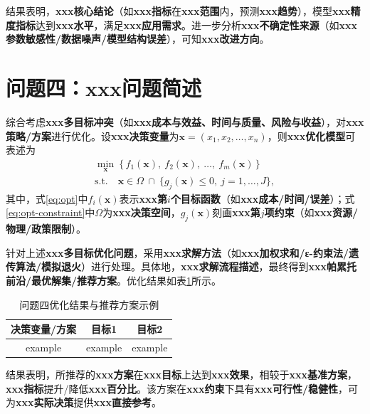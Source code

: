 \documentclass[draft,12pt,a4paper]{ctexart}
\theoremstyle{definition}
\begin{document}
结果表明，\textbf{xxx核心结论}（如\textbf{xxx指标}在\textbf{xxx范围}内，预测\textbf{xxx趋势}），模型\textbf{xxx精度指标}达到\textbf{xxx水平}，满足\textbf{xxx应用需求}。进一步分析\textbf{xxx不确定性来源}（如\textbf{xxx参数敏感性/数据噪声/模型结构误差}），可知\textbf{xxx改进方向}。


\section{问题四：\textbf{xxx问题简述}}

综合考虑\textbf{xxx多目标冲突}（如\textbf{xxx成本与效益、时间与质量、风险与收益}），对\textbf{xxx策略/方案}进行优化。设\textbf{xxx决策变量}为$\boldsymbol{x}=(x_1,x_2,\dots,x_n)$，则\textbf{xxx优化模型}可表述为
\begin{gather}
  \min_{\boldsymbol{x}}\ \big\{\,f_1(\boldsymbol{x}),\ f_2(\boldsymbol{x}),\ \dots,\ f_m(\boldsymbol{x})\,\big\}
    \label{eq:opt}\\[2pt]
  \text{s.t.}\quad \boldsymbol{x}\in \Omega\ \cap\ \{g_j(\boldsymbol{x})\le 0,\ j=1,\dots,J\},
  \label{eq:opt-constraint}
\end{gather}
其中，式\eqref{eq:opt}中$f_i(\boldsymbol{x})$表示\textbf{xxx第$i$个目标函数}（如\textbf{xxx成本/时间/误差}）；式\eqref{eq:opt-constraint}中$\Omega$为\textbf{xxx决策空间}，$g_j(\boldsymbol{x})$刻画\textbf{xxx第$j$项约束}（如\textbf{xxx资源/物理/政策限制}）。

针对上述\textbf{xxx多目标优化问题}，采用\textbf{xxx求解方法}（如\textbf{xxx加权求和/ε-约束法/遗传算法/模拟退火}）进行处理。具体地，\textbf{xxx求解流程描述}，最终得到\textbf{xxx帕累托前沿/最优解集/推荐方案}。优化结果如表\ref{tab:q4-result}所示。

\begin{table}[H]\centering
  \caption{问题四优化结果与推荐方案示例}\label{tab:q4-result}
  \small
  \begin{tabular}{ccc}
    \toprule
    \textbf{决策变量/方案} & \textbf{目标1} & \textbf{目标2} \\
    \midrule
    example & example & example \\
    \bottomrule
  \end{tabular}
\end{table}

结果表明，所推荐的\textbf{xxx方案}在\textbf{xxx目标}上达到\textbf{xxx效果}，相较于\textbf{xxx基准方案}，\textbf{xxx指标}提升/降低\textbf{xxx百分比}。该方案在\textbf{xxx约束}下具有\textbf{xxx可行性/稳健性}，可为\textbf{xxx实际决策}提供\textbf{xxx直接参考}。
\end{document}
